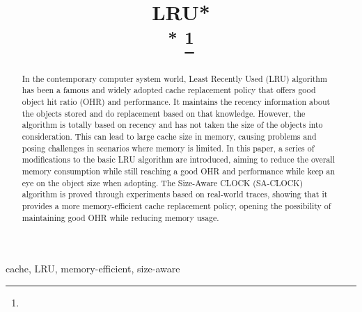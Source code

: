 \documentclass[conference]{IEEEtran}
\begin{document}
\title{LRU*\\
{\footnotesize \textsuperscript{*}}
\thanks{}
}

\author{
}

\maketitle

\begin{abstract}
	In the contemporary computer system world, Least Recently Used (LRU) algorithm has been a famous and widely adopted cache replacement policy that offers good object hit ratio (OHR) and performance. It maintains the recency information about the objects stored and do replacement based on that knowledge. However, the algorithm is totally based on recency and has not taken the size of the objects into consideration. This can lead to large cache size in memory, causing problems and posing challenges in scenarios where memory is limited. In this paper, a series of modifications to the basic LRU algorithm are introduced, aiming to reduce the overall memory consumption while still reaching a good OHR and performance while keep an eye on the object size when adopting. The Size-Aware CLOCK (SA-CLOCK) algorithm is proved through experiments based on real-world traces, showing that it provides a more memory-efficient cache replacement policy, opening the possibility of maintaining good OHR while reducing memory usage.
\end{abstract}

\begin{IEEEkeywords}
	cache, LRU, memory-efficient, size-aware
\end{IEEEkeywords}
\end{document}
